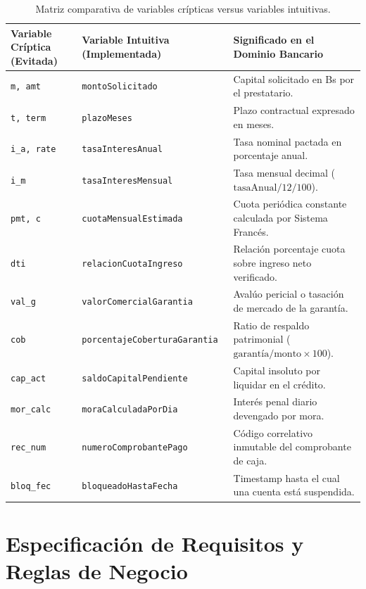 \documentclass[11pt,letterpaper]{report}
\begin{document}
\begin{table}[htbp]
\centering
\small
\begin{tabularx}{\textwidth}{l p{5cm} X}
\toprule
\textbf{Variable Críptica (Evitada)} & \textbf{Variable Intuitiva (Implementada)} & \textbf{Significado en el Dominio Bancario} \\
\midrule
\texttt{m, amt} & \texttt{montoSolicitado} & Capital solicitado en Bs por el prestatario. \\
\texttt{t, term} & \texttt{plazoMeses} & Plazo contractual expresado en meses. \\
\texttt{i\_a, rate} & \texttt{tasaInteresAnual} & Tasa nominal pactada en porcentaje anual. \\
\texttt{i\_m} & \texttt{tasaInteresMensual} & Tasa mensual decimal ($\text{tasaAnual} / 12 / 100$). \\
\texttt{pmt, c} & \texttt{cuotaMensualEstimada} & Cuota periódica constante calculada por Sistema Francés. \\
\texttt{dti} & \texttt{relacionCuotaIngreso} & Relación porcentaje cuota sobre ingreso neto verificado. \\
\texttt{val\_g} & \texttt{valorComercialGarantia} & Avalúo pericial o tasación de mercado de la garantía. \\
\texttt{cob} & \texttt{porcentajeCoberturaGarantia} & Ratio de respaldo patrimonial ($\text{garantía} / \text{monto} \times 100$). \\
\texttt{cap\_act} & \texttt{saldoCapitalPendiente} & Capital insoluto por liquidar en el crédito. \\
\texttt{mor\_calc} & \texttt{moraCalculadaPorDia} & Interés penal diario devengado por mora. \\
\texttt{rec\_num} & \texttt{numeroComprobantePago} & Código correlativo inmutable del comprobante de caja. \\
\texttt{bloq\_fec} & \texttt{bloqueadoHastaFecha} & Timestamp hasta el cual una cuenta está suspendida. \\
\bottomrule
\end{tabularx}
\caption{Matriz comparativa de variables crípticas versus variables intuitivas.}
\end{table}

\chapter{Especificación de Requisitos y Reglas de Negocio}
\end{document}
